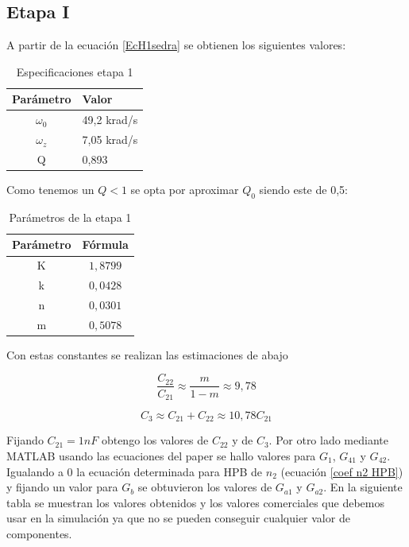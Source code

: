 \subsection{Etapa I}

A partir de la ecuación \ref{EcH1sedra} se obtienen los siguientes valores:

\begin{table}[h]
\begin{tabular}{|c|l|}
\hline
\textbf{Parámetro} & \textbf{Valor} \\ \hline
$\omega_0$         & 49,2 krad/s   \\ \hline
$\omega_z$         & 7,05 krad/s   \\ \hline
Q                  & 0,893         \\ \hline
\end{tabular}
\centering
\caption{Especificaciones etapa 1}
\end{table}

Como tenemos un $Q<1$ se opta por aproximar $Q_0$ siendo este de 0,5: 

\begin{table}[h!]
\begin{tabular}{|c|c|}
\hline
\textbf{Parámetro} & \textbf{Fórmula} \\ \hline
K                  & $1,8799$             \\ \hline
k                  & $0,0428$             \\ \hline
n                  & $0,0301$             \\ \hline
m                  & $0,5078$             \\ \hline
\end{tabular}
\centering
\caption{Parámetros de la etapa 1}
\end{table}

Con estas constantes se realizan las estimaciones de abajo

\begin{equation}
\frac{C_{22}}{C_{21}} \approx \frac{m}{1-m} \approx 9,78
\end{equation}

\begin{equation}
C_3 \approx C_{21} + C_{22} \approx 10,78 C_{21}
\end{equation}


Fijando $C_{21} = 1nF$ obtengo los valores de $C_{22}$ y de $C_3$. Por otro lado mediante MATLAB usando las ecuaciones del paper se hallo valores para $G_1$, $G_{41}$ y $G_{42}$. Igualando a 0 la ecuación determinada para HPB de $n_2$ (ecuación \ref{coef n2 HPB}) y fijando un valor para $G_b$ se obtuvieron los valores de $G_{a1}$ y $ G_{a2} $. En la siguiente tabla se muestran los valores obtenidos y los valores comerciales que debemos usar en la simulación ya que no se pueden conseguir cualquier valor de componentes.

